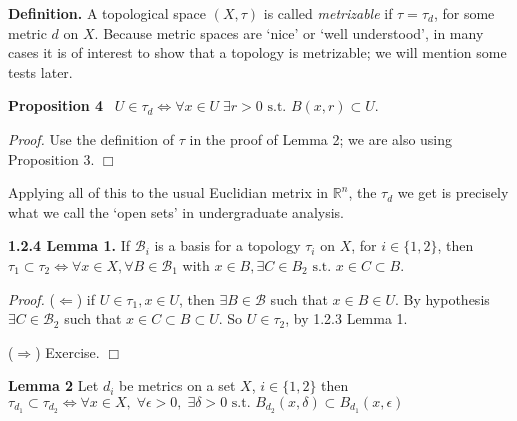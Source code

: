 \documentclass[12pt]{article}
\newcommand{\st}[0]{ \textrm{ s.t. } }
\newcommand{\rimply}[0] { \Rightarrow }
\newcommand{\limply}[0] { \Leftarrow }
\newcommand{\lrimply}[0] { \Leftrightarrow }
\newcommand{\reals}[0] { \mathbb{R}}
\newcommand{\eps}[0] {  \epsilon }
\newcommand{\B}[0] { \mathcal{B} }
\begin{document}
\begin{flushleft} 
 { \bf Definition.}  A topological space $(X, \tau)$ is called \emph{metrizable}
 if $\tau = \tau_d$, for some metric $d$ on $X$. Because metric spaces are 
`nice' or `well understood', in many cases it is of interest to show that a 
topology is metrizable; we will mention some tests later. \end{flushleft}



\begin{flushleft} 
 { \bf Proposition 4 } \ $U \in \tau_d \lrimply \forall x \in U \; \exists r>0 \st B(x,r) \subset U$.
\end{flushleft}

\begin{flushleft} 
 \emph{Proof.  }Use the definition of $\tau$ in the proof of Lemma 2;
we are  also using Proposition 3. $\Box$ \end{flushleft}




\begin{flushleft} 
 Applying all of this to the usual Euclidian metrix in $\reals^n$, the $\tau_d$ 
we get is precisely what we call the `open sets' in undergraduate analysis.
\end{flushleft}


\begin{flushleft} 
 { \bf 1.2.4 Lemma  1. }  If $\B_i$ is a basis for a topology $\tau_i$ on $X$,
for 
 $i \in \{1,2\}$, then $\tau_1 \subset \tau_2 \lrimply \forall x \in X, \forall B \in \B_1$ with $x \in B, \exists C \in B_2 \st x \in C \subset B$. \\
\end{flushleft} 


\begin{flushleft}  
 \emph{Proof.  }($\limply$) if $U \in \tau_1, x \in U$, then $\exists B \in \B$ such that $x \in B \in U$. By hypothesis $\exists C \in \B_2$ such that
$x \in C \subset B \subset U$. So $U \in \tau_2$, by 1.2.3 
Lemma 1.

($\rimply$) Exercise.
 $\Box$
\end{flushleft}



\begin{flushleft} {\bf Lemma 2 } 
Let $d_i$ be metrics on a set $X$, $i \in \{ 1,2\}$ then $\tau_{d_1} \subset \tau _{d_2} \lrimply \forall x \in X, \; \forall \eps > 0, \; \exists \delta > 0 \st B_{d_2}(x, \delta) \subset B_{d_1}(x, \eps)  $

\end{flushleft}
\end{document}
